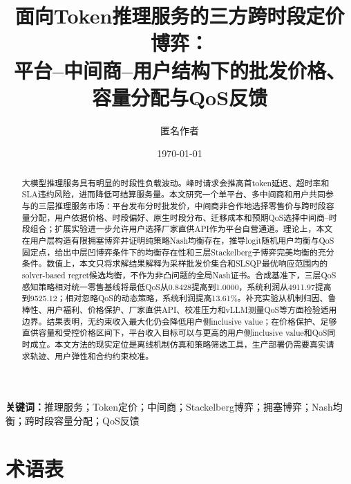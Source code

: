\documentclass[UTF8,11pt]{ctexart}
\title{\textbf{面向Token推理服务的三方跨时段定价博弈：\\
平台--中间商--用户结构下的批发价格、容量分配与QoS反馈}}
\author{匿名作者}
\date{\today}
\begin{document}
\maketitle

\begin{abstract}
大模型推理服务具有明显的时段性负载波动。峰时请求会推高首token延迟、超时率和SLA违约风险，进而降低可结算服务量。本文研究一个单平台、多中间商和用户共同参与的三层推理服务市场：平台发布分时批发价，中间商非合作地选择零售价与跨时段容量分配，用户依据价格、时段偏好、原生时段分布、迁移成本和预期QoS选择中间商--时段组合；扩展实验进一步允许用户选择厂家直供API作为平台自营通道。理论上，本文在用户层构造有限拥塞博弈并证明纯策略Nash均衡存在，推导logit随机用户均衡与QoS固定点，给出中层凹博弈条件下的均衡存在性和三层Stackelberg子博弈完美均衡的充分条件。数值上，本文只将求解结果解释为采样批发价集合和SLSQP最优响应范围内的solver-based regret候选均衡，不作为非凸问题的全局Nash证书。合成基准下，三层QoS感知策略相对统一零售基线将最低QoS从0.8428提高到1.0000，系统利润从4911.97提高到9525.12；相对忽略QoS的动态策略，系统利润提高13.61\%。补充实验从机制归因、鲁棒性、用户福利、价格保护、厂家直供API、校准压力和vLLM测量QoS等方面检验适用边界。结果表明，无约束收入最大化仍会降低用户侧inclusive value；在价格保护、足够直供容量和受控价格区间下，平台收入目标可以与更高的用户侧inclusive value和QoS同时成立。本文方法的现实定位是离线机制仿真和策略筛选工具，生产部署仍需要真实请求轨迹、用户弹性和合约约束校准。
\end{abstract}

\noindent\textbf{关键词：}推理服务；Token定价；中间商；Stackelberg博弈；拥塞博弈；Nash均衡；跨时段容量分配；QoS反馈

\section*{术语表}
\label{sec:nomenclature}
\end{document}
